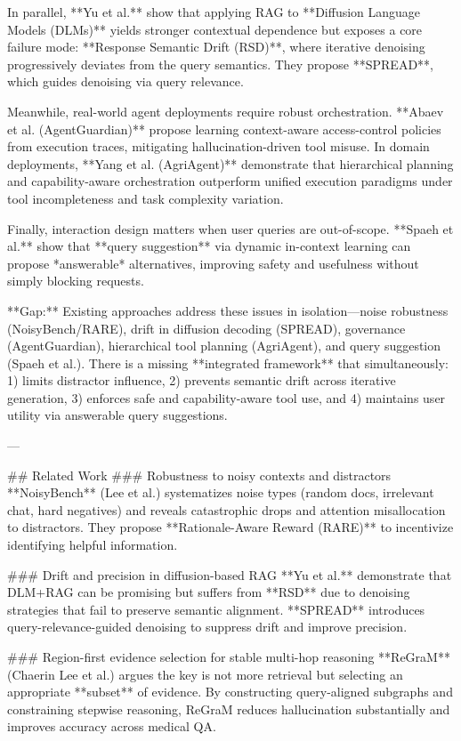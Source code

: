 In parallel, **Yu et al.** show that applying RAG to **Diffusion Language Models (DLMs)** yields stronger contextual dependence but exposes a core failure mode: **Response Semantic Drift (RSD)**, where iterative denoising progressively deviates from the query semantics. They propose **SPREAD**, which guides denoising via query relevance.  

Meanwhile, real-world agent deployments require robust orchestration. **Abaev et al. (AgentGuardian)** propose learning context-aware access-control policies from execution traces, mitigating hallucination-driven tool misuse. In domain deployments, **Yang et al. (AgriAgent)** demonstrate that hierarchical planning and capability-aware orchestration outperform unified execution paradigms under tool incompleteness and task complexity variation.  

Finally, interaction design matters when user queries are out-of-scope. **Spaeh et al.** show that **query suggestion** via dynamic in-context learning can propose *answerable* alternatives, improving safety and usefulness without simply blocking requests.  

**Gap:** Existing approaches address these issues in isolation—noise robustness (NoisyBench/RARE), drift in diffusion decoding (SPREAD), governance (AgentGuardian), hierarchical tool planning (AgriAgent), and query suggestion (Spaeh et al.). There is a missing **integrated framework** that simultaneously:  
1) limits distractor influence,  
2) prevents semantic drift across iterative generation,  
3) enforces safe and capability-aware tool use, and  
4) maintains user utility via answerable query suggestions.

---

## Related Work  
### Robustness to noisy contexts and distractors  
**NoisyBench** (Lee et al.) systematizes noise types (random docs, irrelevant chat, hard negatives) and reveals catastrophic drops and attention misallocation to distractors. They propose **Rationale-Aware Reward (RARE)** to incentivize identifying helpful information.  

### Drift and precision in diffusion-based RAG  
**Yu et al.** demonstrate that DLM+RAG can be promising but suffers from **RSD** due to denoising strategies that fail to preserve semantic alignment. **SPREAD** introduces query-relevance-guided denoising to suppress drift and improve precision.

### Region-first evidence selection for stable multi-hop reasoning  
**ReGraM** (Chaerin Lee et al.) argues the key is not more retrieval but selecting an appropriate **subset** of evidence. By constructing query-aligned subgraphs and constraining stepwise reasoning, ReGraM reduces hallucination substantially and improves accuracy across medical QA.

